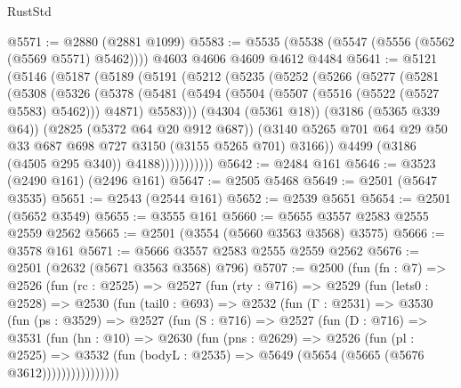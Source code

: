 \begin{lexlean}{RustStd}
\begin{coremodule}
{\begin{coremodule}
{{{{{{{{{{{{{{{{{{{{@5571 := @2880 (@2881 @1099)
@5583 := @5535 (@5538 (@5547 (@5556 (@5562 (@5569 @5571) @5462)))) @4603 @4606 @4609 @4612 @4484
@5641 := @5121
    (@5146
      (@5187
        (@5189
          (@5191
            (@5212
              (@5235
                (@5252
                  (@5266
                    (@5277
                      (@5281
                        (@5308
                          (@5326
                            (@5378
                              (@5481
                                (@5494
                                  (@5504 (@5507 (@5516 (@5522 (@5527 @5583) @5462))) @4871)
                                  @5583)))
                            (@4304 (@5361 @18))
                            (@3186 (@5365 @339 @64))
                            (@2825 (@5372 @64 @20 @912 @687))
                            (@3140
                              @5265
                              @701
                              @64
                              @29
                              @50
                              @33
                              @687
                              @698
                              @727
                              @3150
                              (@3155 @5265 @701)
                              @3166))
                          @4499
                          (@3186 (@4505 @295 @340))
                          @4188)))))))))))
@5642 := @2484 @161
@5646 := @3523 (@2490 @161) (@2496 @161)
@5647 := @2505 @5468
@5649 := @2501 (@5647 @3535)
@5651 := @2543 (@2544 @161)
@5652 := @2539 @5651
@5654 := @2501 (@5652 @3549)
@5655 := @3555 @161
@5660 := @5655 @3557 @2583 @2555 @2559 @2562
@5665 := @2501 (@3554 (@5660 @3563 @3568) @3575)
@5666 := @3578 @161
@5671 := @5666 @3557 @2583 @2555 @2559 @2562
@5676 := @2501 (@2632 (@5671 @3563 @3568) @796)
@5707 := @2500
    (fun (fn : @7) =>
    @2526
      (fun (rc : @2525) =>
      @2527
        (fun (rty : @716) =>
        @2529
          (fun (lets0 : @2528) =>
          @2530
            (fun (tail0 : @693) =>
            @2532
              (fun (Γ : @2531) =>
              @3530
                (fun (ps : @3529) =>
                @2527
                  (fun (S : @716) =>
                  @2527
                    (fun (D : @716) =>
                    @3531
                      (fun (hn : @10) =>
                      @2630
                        (fun (pns : @2629) =>
                        @2526
                          (fun (pl : @2525) =>
                          @3532
                            (fun (bodyL : @2535) => @5649 (@5654 (@5665 (@5676 @3612))))))))))))))))
}}}}}}}}}}}}}}}}}}}}
\end{coremodule}}
\end{coremodule}
\end{lexlean}
